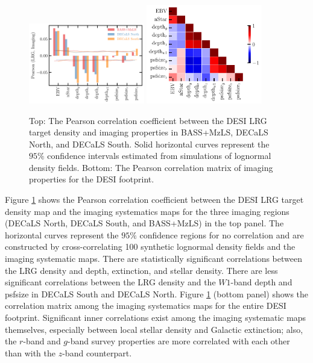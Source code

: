\begin{figure}
\centering
 \includegraphics[width=0.45\textwidth]{figures/pcc.pdf} 
 \includegraphics[width=0.45\textwidth]{figures/pccx.pdf}  
 \caption{Top: The Pearson correlation coefficient between the DESI LRG target density and imaging properties in BASS+MzLS, DECaLS North, and DECaLS South. Solid horizontal curves represent the $95\%$ confidence intervals estimated from simulations of lognormal density fields. Bottom: The Pearson correlation matrix of imaging properties for the DESI footprint.}
 \label{fig:pcc}
\end{figure}

Figure \ref{fig:pcc} shows the Pearson correlation coefficient between the DESI LRG target density map and the imaging systematics maps for the three imaging regions (DECaLS North, DECaLS South, and BASS+MzLS) in the top panel. The horizontal curves represent the $95\%$ confidence regions for no correlation and are constructed by cross-correlating 100 synthetic lognormal density fields and the imaging systematic maps. There are statistically significant correlations between the LRG density and depth, extinction, and stellar density. There are less significant correlations between the LRG density and the $W1$-band depth and psfsize in DECaLS South and DECaLS North. Figure \ref{fig:pcc} (bottom panel) shows the correlation matrix among the imaging systematics maps for the entire DESI footprint. Significant inner correlations exist among the imaging systematic maps themselves, especially between local stellar density and Galactic extinction; also, the $r$-band and $g$-band survey properties are more correlated with each other than with the $z$-band counterpart. 

